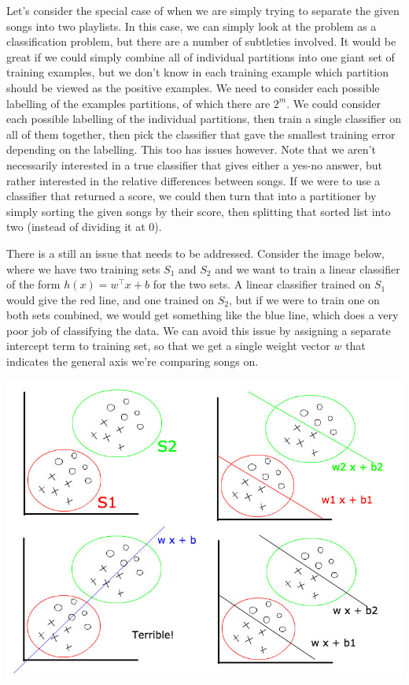 \documentclass[12pt]{article}
\begin{document}
Let's consider the special case of when we are simply trying to separate the given songs into two playlists. In this case, we can simply look at the problem as a classification problem, but there are a number of subtleties involved. It would be great if we could simply combine all of individual partitions into one giant set of training examples, but we don't know in each training example which partition should be viewed as the positive examples. We need to consider each possible labelling of the examples partitions, of which there are $2^m$. We could consider each possible labelling of the individual partitions, then train a single classifier on all of them together, then pick the classifier that gave the smallest training error depending on the labelling. This too has issues however. Note that we aren't necessarily interested in a true classifier that gives either a yes-no answer, but rather interested in the relative differences between songs. If we were to use a classifier that returned a score, we could then turn that into a partitioner by simply sorting the given songs by their score, then splitting that sorted list into two (instead of dividing it at 0).

There is a still an issue that needs to be addressed. Consider the image below, where we have two training sets $S_1$ and $S_2$ and we want to train a linear classifier of the form $h(x) = w^\top x + b$ for the two sets. A linear classifier trained on $S_1$ would give the red line, and one trained on $S_2$, but if we were to train one on both sets combined, we would get something like the blue line, which does a very poor job of classifying the data. We can avoid this issue by assigning a separate intercept term to training set, so that we get a single weight vector $w$ that indicates the general axis we're comparing songs on.

\includegraphics[scale=0.5]{interceptTerms}
\end{document}
